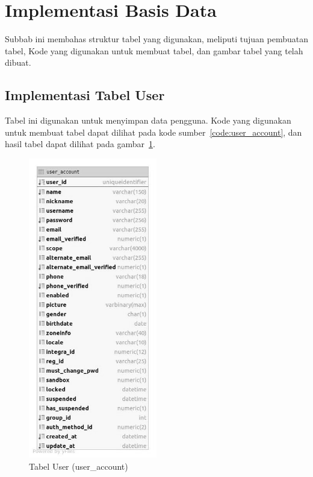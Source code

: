\section{Implementasi Basis Data}
\par Subbab ini membahas struktur tabel yang digunakan, meliputi tujuan pembuatan tabel, Kode yang digunakan untuk membuat tabel, dan gambar tabel yang telah dibuat.

\subsection{Implementasi Tabel User}
\par Tabel ini digunakan untuk menyimpan data pengguna. Kode yang digunakan untuk membuat tabel dapat dilihat pada kode sumber~\ref{code:user_account}, dan hasil tabel dapat dilihat pada gambar~\ref{tabel_user_account}.

\begin{figure}[H]
    \centering\includegraphics[width=0.5\textwidth]{bab4/figures/tabel_user_account.jpg}
    \caption{Tabel User (user\_account)}
    \label{tabel_user_account}
\end{figure}

